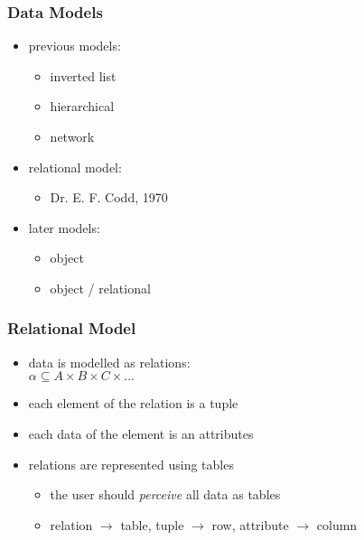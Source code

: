 \documentclass[dvipsnames]{beamer}
\theoremstyle{plain}
\begin{document}
\begin{frame}
  \frametitle{Data Models}

  \begin{itemize}
    \item previous models:
    \begin{itemize}
      \item inverted list
      \item hierarchical
      \item network
    \end{itemize}

    \pause
    \item relational model:
    \begin{itemize}
      \item Dr. E. F. Codd, 1970
    \end{itemize}

    \pause
    \item later models:
    \begin{itemize}
      \item object
      \item object / relational
    \end{itemize}
  \end{itemize}
\end{frame}

\begin{frame}
  \frametitle{Relational Model}

  \begin{itemize}
    \item data is modelled as \alert{relations}:\\
      $\alpha \subseteq A \times B \times C \times ...$

    \pause
    \medskip
    \item each element of the relation is a \alert{tuple}
    \item each data of the element is an \alert{attributes}

    \pause
    \medskip
    \item relations are represented using tables
    \begin{itemize}
      \item the user should \emph{perceive} all data as tables
      \item relation $\rightarrow$ table, tuple $\rightarrow$ row,
        attribute $\rightarrow$ column
    \end{itemize}
  \end{itemize}
\end{frame}
\end{document}
